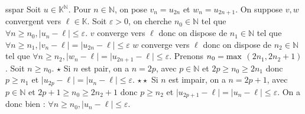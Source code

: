 \documentclass[12pt,a4paper]{report}
\begin{document}
\begin{demonstration}{sspar}
Soit $u \in \mathbb{K}^\mathbb{N}$. Pour $n \in \mathbb{N}$, on pose $v_n = u_{2n}$ et $w_n = u_{2n+1}$. On suppose $v, w$ convergent vers $\ell \in \mathbb{K}$.
\newline Soit $\varepsilon > 0$, on cherche $n_0 \in \mathbb{N}$ tel que $\forall n \geq n_0, \lvert u_n - \ell \rvert \leq \varepsilon$.
\newline $v$ converge vers $\ell$ donc on dispose de $n_1 \in \mathbb{N}$ tel que $\forall n \geq n_1, \lvert v_n - \ell \rvert = \lvert u_{2n} -\ell \rvert \leq \varepsilon$
\newline $w$ converge vers $\ell$ donc on dispose de $n_2 \in \mathbb{N}$ tel que $\forall n \geq n_2, \lvert w_n - \ell \rvert = \lvert u_{2n+1} - \ell \rvert \leq \varepsilon$.
\newline \newline Prenons $n_0 = \rm{max}$ $(2n_1,2n_2+1)$. Soit $n \geq n_0$. \newline
$\star$ \; Si $n$ est pair, on a $n=2p$, avec $p \in \mathbb{N}$ et $2p \geq n_0 \geq 2n_1$ donc $p \geq n_1$ et $\lvert u_{2p} - \ell \rvert = \lvert u_n - \ell \rvert \leq \varepsilon$. \newline
$\star \star$ Si $n$ est impair, on a $n=2p+1$, avec $p \in \mathbb{N}$ et $2p+1 \geq n_0 \geq 2n_2+1$ donc $p \geq n_2$ et $\lvert u_{2p+1} - \ell \rvert = \lvert u_n - \ell \rvert \leq \varepsilon$.
\newline \newline On a donc bien : $\forall n \geq n_0, \lvert u_n - \ell \rvert \leq \varepsilon$.
\end{demonstration}
\end{document}
